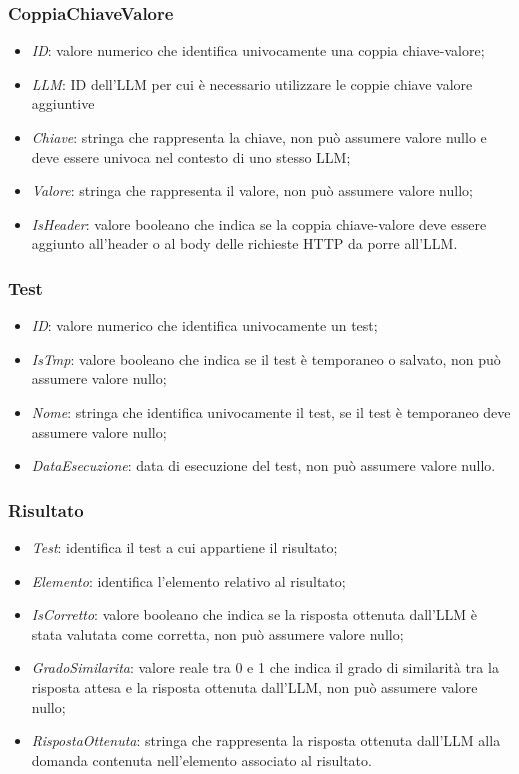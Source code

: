 \subsubsection{CoppiaChiaveValore}
\begin{itemize}
    \item \textit{ID}: valore numerico che identifica univocamente una coppia chiave-valore;
    \item \textit{LLM}: ID dell'LLM per cui è necessario utilizzare le coppie chiave valore aggiuntive  
    \item \textit{Chiave}: stringa che rappresenta la chiave, non può assumere valore nullo e deve essere univoca nel contesto di uno stesso LLM;
    \item \textit{Valore}: stringa che rappresenta il valore, non può assumere valore nullo;
    \item \textit{IsHeader}: valore booleano che indica se la coppia chiave-valore deve essere aggiunto all'header o al body delle richieste HTTP da porre all'LLM. 
\end{itemize}

\subsubsection{Test}
\begin{itemize}
    \item \textit{ID}: valore numerico che identifica univocamente un test;
    \item \textit{IsTmp}: valore booleano che indica se il test è temporaneo o salvato, non può assumere valore nullo;
    \item \textit{Nome}: stringa che identifica univocamente il test, se il test è temporaneo deve assumere valore nullo;
    \item \textit{DataEsecuzione}: data di esecuzione del test, non può assumere valore nullo.
\end{itemize}

\subsubsection{Risultato}
\begin{itemize}
    \item \textit{Test}: identifica il test a cui appartiene il risultato;
    \item \textit{Elemento}: identifica l'elemento relativo al risultato;
    \item \textit{IsCorretto}: valore booleano che indica se la risposta ottenuta dall'LLM è stata valutata come corretta, non può assumere valore nullo;
    \item \textit{GradoSimilarita}: valore reale tra 0 e 1 che indica il grado di similarità tra la risposta attesa e la risposta ottenuta dall'LLM, non può assumere valore nullo;
    \item \textit{RispostaOttenuta}: stringa che rappresenta la risposta ottenuta dall'LLM alla domanda contenuta nell'elemento associato al risultato.
\end{itemize}